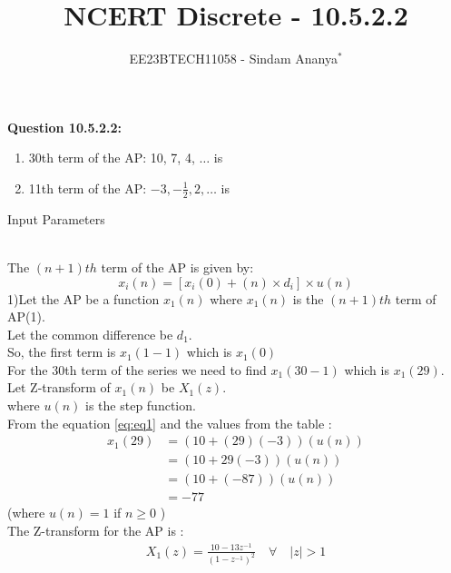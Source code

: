 \documentclass[journal,12pt,twocolumn]{IEEEtran}
\theoremstyle{remark}
\begin{document}

\vspace{3cm}

\title{NCERT Discrete - 10.5.2.2}
\author{EE23BTECH11058 - Sindam Ananya$^{*}$%
}
\maketitle
\newpage
\bigskip

\renewcommand{\thefigure}{\theenumi}
\renewcommand{\thetable}{\theenumi}

\vspace{3cm}
\textbf{Question 10.5.2.2:} 
\begin{enumerate}
\item 30th term of the AP: 10, 7, 4, $\ldots$ is 
\item 11th term of the AP: $-3, -\frac{1}{2}, 2, \ldots$ is
\end{enumerate}
\solution
\begin{table}[h!]
    \centering
    
    \caption{Input Parameters}
    \label{tab:table1}
    \end{table}\\
The $(n+1)th$ term of the AP is given by:
\begin{equation}
    x_i(n) = [x_i(0) + (n) \times d_i] \times u(n)
    \label{eq:eq1}
\end{equation}
1)Let the AP be a function $x_1(n)$ where $x_1(n)$ is the $(n+1)th$ term of AP(1).\\
Let the common difference be $d_1$.\\
So, the first term is $x_1(1-1)$ which is $x_1(0)$\\ 
For the 30th term of the series we need to find $x_1(30-1)$ which is $x_1(29)$.\\
Let Z-transform of $x_1(n)$ be $X_1(z)$.\\
where \(u(n)\) is the step function.\\
From the equation \eqref{eq:eq1} and the values from the table  :
\begin{align}
x_1(29) &= (10 + (29)(-3))(u(n))\\
&= (10 + 29(-3))(u(n))\\
&= (10+ (-87))(u(n))  \\
&= -77
\end{align}
(where $u(n) = 1$ if $n \geq 0$ )\\ 
The Z-transform for the AP is :               
\begin{align}
X_1(z) = \frac{10 - 13z^{-1}}{(1-z^{-1})^2} \quad \forall \quad |z| > 1
\end{align}
\end{document}
